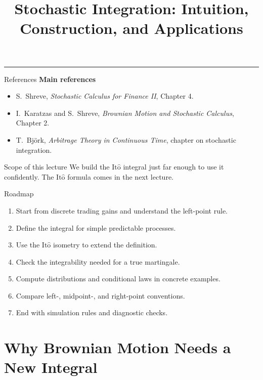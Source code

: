 \documentclass[handout,10pt,aspectratio=169]{beamer}
\title{Stochastic Integration: Intuition, Construction, and Applications}
\author{}
\date{}
\newcommand{\Ito}{\mathrm{It\hat{o}}}
\begin{document}
\begin{frame}[plain]
  \vfill
  {\inserttitle\par}
  \medskip
  {\color{BootcampBlueDark}\rule{0.95\textwidth}{0.8pt}}
  \vfill
\end{frame}

\begin{frame}{References}
\footnotesize
\textbf{Main references}
\begin{itemize}\setlength{\itemsep}{0.55em}
  \item S.~Shreve, \emph{Stochastic Calculus for Finance II}, Chapter 4.
  \item I.~Karatzas and S.~Shreve, \emph{Brownian Motion and Stochastic Calculus}, Chapter 2.
  \item T.~Bj\"ork, \emph{Arbitrage Theory in Continuous Time}, chapter on stochastic integration.
\end{itemize}
\begin{block}{Scope of this lecture}
We build the \(\Ito\) integral just far enough to use it confidently. The \(\Ito\) formula comes in the next lecture.
\end{block}
\end{frame}

\begin{frame}{Roadmap}
\begin{enumerate}\setlength{\itemsep}{0.45em}
  \item Start from discrete trading gains and understand the left-point rule.
  \item Define the integral for simple predictable processes.
  \item Use the \(\Ito\) isometry to extend the definition.
  \item Check the integrability needed for a true martingale.
  \item Compute distributions and conditional laws in concrete examples.
  \item Compare left-, midpoint-, and right-point conventions.
  \item End with simulation rules and diagnostic checks.
\end{enumerate}
\end{frame}

\section{Why Brownian Motion Needs a New Integral}
\end{document}
